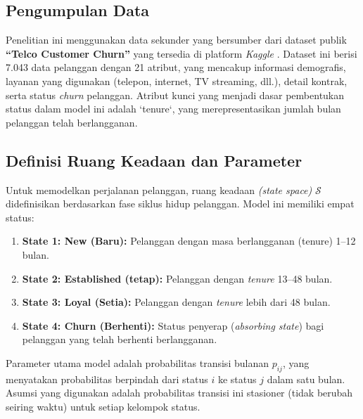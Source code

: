 \documentclass[a4paper,12pt]{article}
\begin{document}
\subsection{Pengumpulan Data}
Penelitian ini menggunakan data sekunder yang bersumber dari dataset publik \textbf{“Telco Customer Churn”} yang tersedia di platform \textit{Kaggle} \citep{kaggle_telco_churn}. Dataset ini berisi 7.043 data pelanggan dengan 21 atribut, yang mencakup informasi demografis, layanan yang digunakan (telepon, internet, TV streaming, dll.), detail kontrak, serta status \textit{churn} pelanggan. Atribut kunci yang menjadi dasar pembentukan status dalam model ini adalah `tenure`, yang merepresentasikan jumlah bulan pelanggan telah berlangganan.

\subsection{Definisi Ruang Keadaan dan Parameter}
Untuk memodelkan perjalanan pelanggan, ruang keadaan \textit{(state space)} $\mathcal{S}$ didefinisikan berdasarkan fase siklus hidup pelanggan. Model ini memiliki empat status:
\begin{enumerate}
    \item \textbf{State 1: New (Baru):} Pelanggan dengan masa berlangganan (tenure) 1–12 bulan.
    \item \textbf{State 2: Established (tetap):} Pelanggan dengan \textit{tenure} 13–48 bulan.
    \item \textbf{State 3: Loyal (Setia):} Pelanggan dengan \textit{tenure} lebih dari 48 bulan.
    \item \textbf{State 4: Churn (Berhenti):} Status penyerap (\textit{absorbing state}) bagi pelanggan yang telah berhenti berlangganan.
\end{enumerate}
Parameter utama model adalah probabilitas transisi bulanan $p_{ij}$, yang menyatakan probabilitas berpindah dari status $i$ ke status $j$ dalam satu bulan. Asumsi yang digunakan adalah probabilitas transisi ini stasioner (tidak berubah seiring waktu) untuk setiap kelompok status.
\end{document}
